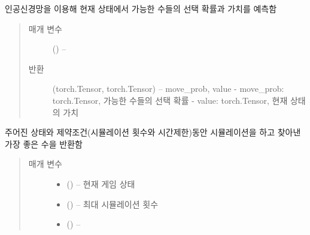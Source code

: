 \documentclass[letterpaper,10pt,english]{sphinxmanual}
\begin{document}
\begin{fulllineitems}
\begin{fulllineitems}
\label{\detokenize{agents.self_learning:agents.self_learning.mcts.MCTSPlanner.predict}}
인공신경망을 이용해 현재 상태에서 가능한 수들의 선택 확률과 가치를 예측함
\begin{quote}\begin{description}
\item[{매개 변수}] \leavevmode
{} ({\hyperref[\detokenize{scripts:scripts.run_game.State}]{}}) -- 

\item[{반환}] \leavevmode
(torch.Tensor, torch.Tensor) -- move\_prob, value
- move\_prob: torch.Tensor, 가능한 수들의 선택 확률
- value: torch.Tensor, 현재 상태의 가치

\end{description}\end{quote}

\end{fulllineitems}


\begin{fulllineitems}
\label{\detokenize{agents.self_learning:agents.self_learning.mcts.MCTSPlanner.search}}
주어진 상태와 제약조건(시뮬레이션 횟수와 시간제한)동안 시뮬레이션을 하고
찾아낸 가장 좋은 수을 반환함
\begin{quote}\begin{description}
\item[{매개 변수}] \leavevmode\begin{itemize}
\item {} 
 ({\hyperref[\detokenize{scripts:scripts.run_game.State}]{}}) -- 현재 게임 상태

\item {} 
 () -- 최대 시뮬레이션 횟수

\item {} 
 () -- 


\end{itemize}
\end{description}
\end{quote}
\end{fulllineitems}
\end{fulllineitems}
\end{document}
